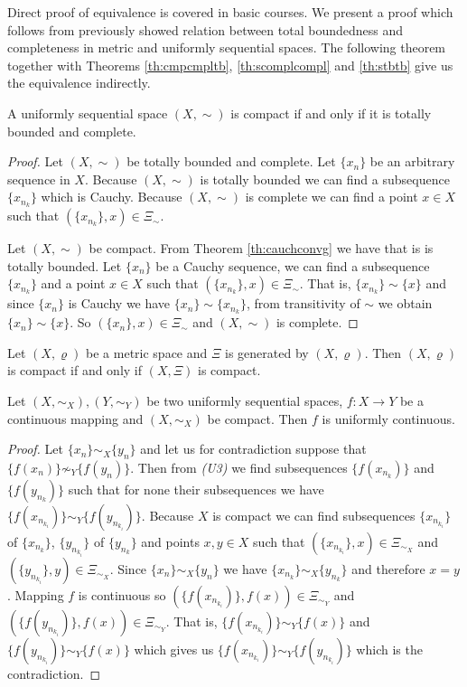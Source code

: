 Direct proof of equivalence is covered in basic courses. We present a proof which follows from previously showed relation between total boundedness and completeness in metric and uniformly sequential spaces. The following theorem together with Theorems \ref{th:cmpcmpltb}, \ref{th:scomplcompl} and \ref{th:stbtb} give us the equivalence indirectly.

\begin{theorem} \label{th:comptbcompl}
A uniformly sequential space $(X,\sim)$ is compact if and only if it is totally bounded and complete.
\end{theorem}
\begin{proof}
Let $(X,\sim)$ be totally bounded and complete. Let $\{x_n\}$ be an arbitrary sequence in $X$. Because $(X,\sim)$ is totally bounded we can find a subsequence $\{x_{n_k}\}$ which is Cauchy. Because $(X,\sim)$ is complete we can find a point $x\in X$ such that $(\{x_{n_k}\}, x)\in\Xi_\sim$.

Let $(X,\sim)$ be compact. From Theorem \ref{th:cauchconvg} we have that is is  totally bounded. Let $\{x_n\}$ be a Cauchy sequence, we can find a subsequence $\{x_{n_k}\}$ and a point $x\in X$ such that $(\{x_{n_k}\}, x)\in\Xi_\sim$. That is, $\{x_{n_k}\}\sim\{x\}$ and since $\{x_n\}$ is Cauchy we have $\{x_n\}\sim\{x_{n_k}\}$, from transitivity of $\sim$ we obtain $\{x_n\}\sim\{x\}$. So $(\{x_n\}, x)\in\Xi_\sim$ and $(X,\sim)$ is complete.
\end{proof}

\begin{corollary} \label{cr:compseqsomp}
Let $(X,\varrho)$ be a metric space and $\Xi$ is generated by $(X,\varrho)$. Then $(X,\varrho)$ is compact if and only if $(X,\Xi)$ is compact.
\end{corollary}

\begin{theorem} \label{th:contucont}
Let $(X,\sim_X), (Y,\sim_Y)$ be two uniformly sequential spaces, $f:X\to Y$ be a continuous mapping and $(X,\sim_X)$ be compact. Then $f$ is uniformly continuous.
\end{theorem}
\begin{proof}
Let $\{x_n\} \sim_X\{y_n\}$ and let us for contradiction suppose that $\{f(x_n)\} \not\sim_Y\{f(y_n)\}$. Then from \emph{(U3)} we find subsequences $\{f(x_{n_k})\}$ and $\{f(y_{n_k})\}$ such that for none their subsequences we have $\{f(x_{n_{k_i}})\} \sim_Y\{f(y_{n_{k_i}})\}$. Because $X$ is compact we can find subsequences $\{x_{n_{k_i}}\}$ of $\{x_{n_k}\}$, $\{y_{n_{k_i}}\}$ of $\{y_{n_k}\}$ and points $x,y\in X$ such that $(\{x_{n_{k_i}}\},x)\in\Xi_{\sim_X}$ and $(\{y_{n_{k_i}}\},y)\in\Xi_{\sim_X}$. Since $\{x_n\} \sim_X\{y_n\}$ we have $\{x_{n_k}\} \sim_X\{y_{n_k}\}$ and therefore $x=y$. Mapping $f$ is continuous so $(\{f(x_{n_{k_i}})\},f(x))\in\Xi_{\sim_Y}$ and $(\{f(y_{n_{k_i}})\},f(x))\in\Xi_{\sim_Y}$. That is, $\{f(x_{n_{k_i}})\}\sim_Y\{f(x)\}$ and $\{f(y_{n_{k_i}})\}\sim_Y\{f(x)\}$ which gives us $\{f(x_{n_{k_i}})\}\sim_Y\{f(y_{n_{k_i}})\}$ which is the contradiction.
\end{proof}

